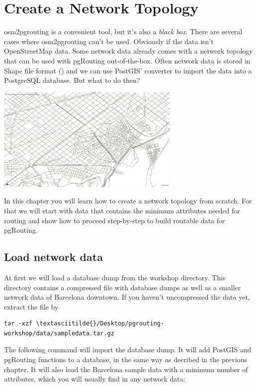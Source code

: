 \documentclass[a4paper,10pt,english]{manual}
\begin{document}
\resetcurrentobjects
\hypertarget{--doc-chapters/topology}{}

\chapter{Create a Network Topology}

osm2pgrouting is a convenient tool, but it's also a \emph{black box}. There are several cases where osm2pgrouting can't be used. Obviously if the data isn't OpenStreetMap data. Some network data already comes with a network topology that can be used with pgRouting out-of-the-box. Often network data is stored in Shape file format () and we can use PostGIS'  converter to import the data into a PostgreSQL database. But what to do then?

{\hfill\includegraphics[width=250pt]{network.png}\hfill}

In this chapter you will learn how to create a network topology from scratch. For that we will start with data that contains the minimum attributes needed for routing and show how to proceed step-by-step to build routable data for pgRouting.


\section{Load network data}

At first we will load a database dump from the workshop  directory. This directory contains a compressed file with database dumps as well as a smaller network data of Barcelona downtown. If you haven't uncompressed the data yet, extract the file by

\begin{Verbatim}[commandchars=\\\{\}]
tar -xzf \textasciitilde{}/Desktop/pgrouting-workshop/data/sampledata.tar.gz
\end{Verbatim}

The following command will import the database dump. It will add PostGIS and pgRouting functions to a database, in the same way as decribed in the previous chapter. It will also load the Barcelona sample data with a minimum number of attributes, which you will usually find in any network data:
\end{document}
